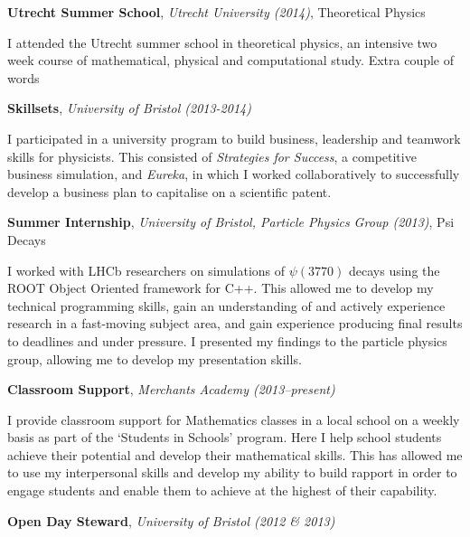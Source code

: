 \documentclass[11pt,a4paper,sans]{moderncv}
\begin{document}
\vspace{1em}

{\large\textbf{Utrecht Summer School}, \textit{Utrecht University (2014)}, Theoretical
Physics}

I attended the Utrecht summer school in theoretical physics, an intensive two
week course of mathematical, physical and computational study. {{ Extra couple
of words }}

\vspace{1em}

{\large\textbf{Skillsets}, \textit{University of Bristol (2013-2014)}}

I participated in a university program to build business, leadership and
teamwork skills for physicists. This consisted of \textit{Strategies for
Success}, a competitive business simulation, and \textit{Eureka}, in which I
worked collaboratively to successfully develop a business plan to capitalise on
a scientific patent.

\vspace{1em}

{\large\textbf{Summer Internship}, \textit{University of Bristol, Particle
Physics Group (2013)}, Psi Decays}

I worked with LHCb researchers on simulations of $\psi(3770)$ decays using the
ROOT Object Oriented framework for C++. This allowed me to develop my technical
programming skills, gain an understanding of and actively experience research in
a fast-moving subject area, and gain experience producing final results to
deadlines and under pressure. I presented my findings to the particle physics
group, allowing me to develop my presentation skills.
    
\vspace{1em}

{\large\textbf{Classroom Support}, \textit{Merchants Academy (2013--present)}}

I provide classroom support for Mathematics classes in a local school on a
weekly basis as part of the `Students in Schools' program. Here I help school
students achieve their potential and develop their mathematical skills. This has
allowed me to use my interpersonal skills and develop my ability to build
rapport in order to engage students and enable them to achieve at the highest of
their capability.

\vspace{1em}

{\large\textbf{Open Day Steward}, \textit{University of Bristol (2012 \& 2013)}
}
\end{document}

